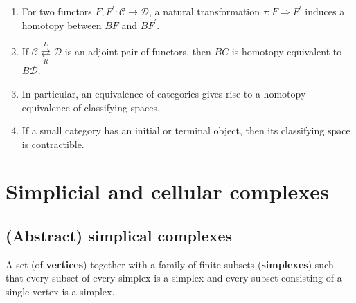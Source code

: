 \begin{theo}
    \begin{enumerate}
        \item For two functors $F, F^{\prime}: \mathcal{C} \rightarrow \mathcal{D}$, a natural transformation $\tau: F \Rightarrow F^{\prime}$ induces a homotopy between $B F$ and $B F^{\prime}$.
        \item If $\mathcal{C} \underset{R}{\stackrel{L}{\rightleftarrows}} \mathcal{D}$ is an adjoint pair of functors, then $B C$ is homotopy equivalent to $B \mathcal{D}$. 
        \item In particular, an equivalence of categories gives rise to a homotopy equivalence of classifying spaces.
        \item If a small category \cc has an initial or terminal object, then its classifying space is contractible.
    \end{enumerate}
\end{theo}









\chapter{Simplicial and cellular complexes}


\section{(Abstract) simplical complexes}

A set (of \textbf{vertices}) together with a  family of finite subsets (\textbf{simplexes}) such that every subset of every simplex is a simplex and every subset consisting of a single vertex is a simplex.  

